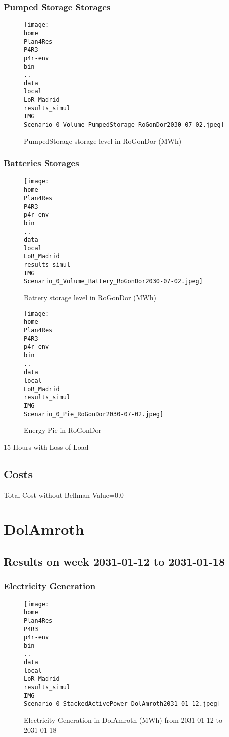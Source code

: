 \documentclass[10pt]{report}
\begin{document}
\subsubsection{Pumped Storage Storages}
\begin{figure}[H]
\centering
\texttt{[image: \\home\\Plan4Res\\P4R3\\p4r-env\\bin\\..\\data\\local\\LoR\_Madrid\\results\_simul\\IMG\\Scenario\_0\_Volume\_PumpedStorage\_RoGonDor2030-07-02.jpeg]}
\caption{PumpedStorage storage level in RoGonDor (MWh)}
\label{fig:Scenario_0_Volume_PumpedStorage_RoGonDor2030-07-02.jpeg}
\end{figure}
\subsubsection{Batteries Storages}
\begin{figure}[H]
\centering
\texttt{[image: \\home\\Plan4Res\\P4R3\\p4r-env\\bin\\..\\data\\local\\LoR\_Madrid\\results\_simul\\IMG\\Scenario\_0\_Volume\_Battery\_RoGonDor2030-07-02.jpeg]}
\caption{Battery storage level in RoGonDor (MWh)}
\label{fig:Scenario_0_Volume_Battery_RoGonDor2030-07-02.jpeg}
\end{figure}
\begin{figure}[H]
\centering
\texttt{[image: \\home\\Plan4Res\\P4R3\\p4r-env\\bin\\..\\data\\local\\LoR\_Madrid\\results\_simul\\IMG\\Scenario\_0\_Pie\_RoGonDor2030-07-02.jpeg]}
\caption{Energy Pie in RoGonDor}
\label{fig:Scenario_0_Pie_RoGonDor2030-07-02.jpeg}
\end{figure}
15 Hours with Loss of Load

\subsection{Costs}

Total Cost without Bellman Value=0.0
\newpage\section{DolAmroth}
\subsection{Results on week 2031-01-12 to 2031-01-18}
\subsubsection{Electricity Generation}
\begin{figure}[H]
\centering
\texttt{[image: \\home\\Plan4Res\\P4R3\\p4r-env\\bin\\..\\data\\local\\LoR\_Madrid\\results\_simul\\IMG\\Scenario\_0\_StackedActivePower\_DolAmroth2031-01-12.jpeg]}
\caption{Electricity Generation in DolAmroth (MWh) from 2031-01-12 to 2031-01-18}
\label{fig:Scenario_0_StackedActivePower_DolAmroth2031-01-12.jpeg}
\end{figure}
\end{document}
